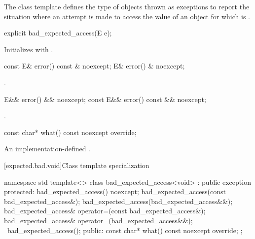\pnum
The class template 
defines the type of objects thrown as exceptions to report the situation
where an attempt is made to access the value of an  object
for which  is .

%
\begin{itemdecl}
explicit bad_expected_access(E e);
\end{itemdecl}

\begin{itemdescr}
\pnum
\effects
Initializes  with .
\end{itemdescr}

%
\begin{itemdecl}
const E& error() const & noexcept;
E& error() & noexcept;
\end{itemdecl}

\begin{itemdescr}
\pnum
\returns
{}.
\end{itemdescr}

%
\begin{itemdecl}
E&& error() && noexcept;
const E&& error() const && noexcept;
\end{itemdecl}

\begin{itemdescr}
\pnum
\returns
{}.
\end{itemdescr}

%
\begin{itemdecl}
const char* what() const noexcept override;
\end{itemdecl}

\begin{itemdescr}
\pnum
\returns
An implementation-defined \ntbs.
\end{itemdescr}

[expected.bad.void]{Class template specialization }

\begin{codeblock}
namespace std {
  template<>
  class bad_expected_access<void> : public exception {
  protected:
    bad_expected_access() noexcept;
    bad_expected_access(const bad_expected_access&);
    bad_expected_access(bad_expected_access&&);
    bad_expected_access& operator=(const bad_expected_access&);
    bad_expected_access& operator=(bad_expected_access&&);
    ~bad_expected_access();
  public:
    const char* what() const noexcept override;
  };
}
\end{codeblock}


